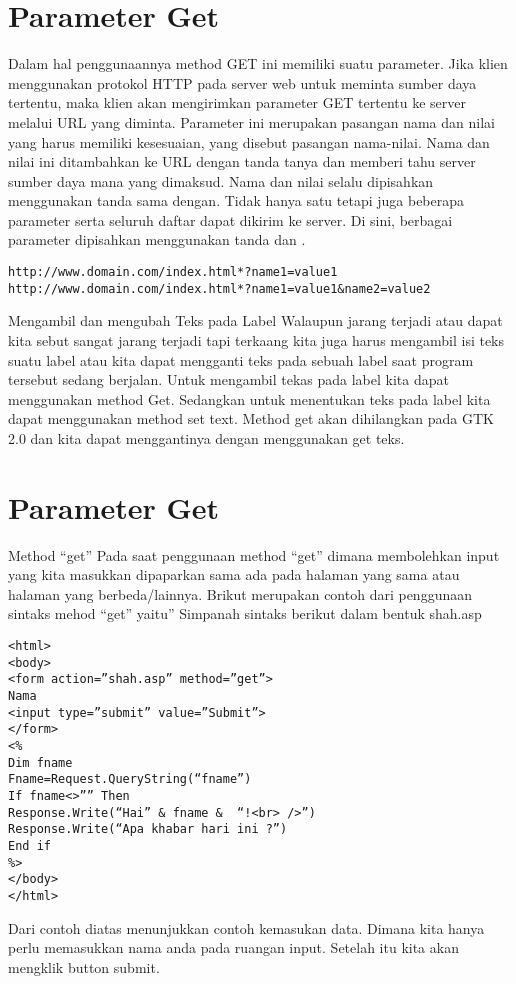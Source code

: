 \section{Parameter Get}
Dalam hal penggunaannya method GET ini memiliki suatu parameter. Jika klien menggunakan protokol HTTP pada server web untuk meminta 
sumber daya tertentu, maka klien akan mengirimkan parameter GET tertentu ke server melalui URL yang diminta. Parameter ini merupakan 
pasangan nama dan nilai yang harus memiliki kesesuaian, yang disebut pasangan nama-nilai.
Nama dan nilai ini ditambahkan ke URL dengan tanda tanya dan memberi tahu server sumber daya mana yang dimaksud. Nama dan nilai selalu dipisahkan menggunakan tanda sama dengan. Tidak hanya satu tetapi juga beberapa parameter serta seluruh daftar dapat dikirim ke server. Di sini, berbagai parameter dipisahkan menggunakan tanda dan .
\begin{verbatim}
http://www.domain.com/index.html*?name1=value1
http://www.domain.com/index.html*?name1=value1&name2=value2
\end{verbatim}

Mengambil dan mengubah Teks pada Label
Walaupun jarang terjadi atau dapat kita sebut sangat jarang terjadi tapi terkaang kita juga harus mengambil isi teks suatu label atau 
kita dapat mengganti teks pada sebuah label saat program tersebut sedang berjalan.
Untuk mengambil tekas pada label kita dapat menggunakan method Get. Sedangkan untuk menentukan teks pada label kita dapat menggunakan 
method set text. 
Method get akan dihilangkan pada GTK 2.0 dan kita dapat menggantinya dengan menggunakan get teks.

\section{Parameter Get}
Method “get”
Pada saat penggunaan method “get” dimana membolehkan input yang kita masukkan dipaparkan sama ada pada halaman yang sama atau halaman 
 yang berbeda/lainnya. Brikut merupakan contoh dari penggunaan sintaks mehod “get” yaitu”
Simpanah sintaks berikut dalam bentuk shah.asp
\begin{verbatim}
<html>
<body>
<form action=”shah.asp” method=”get”>
Nama
<input type=”submit” value=”Submit”>
</form>
<%
Dim fname
Fname=Request.QueryString(“fname”)
If fname<>”” Then
Response.Write(“Hai” & fname &  “!<br> />”)
Response.Write(“Apa khabar hari ini ?”)
End if
%>
</body>
</html>
\end{verbatim}

Dari contoh diatas menunjukkan contoh kemasukan data. Dimana kita hanya perlu memasukkan nama anda pada ruangan input. Setelah itu kita 
akan mengklik button submit.

